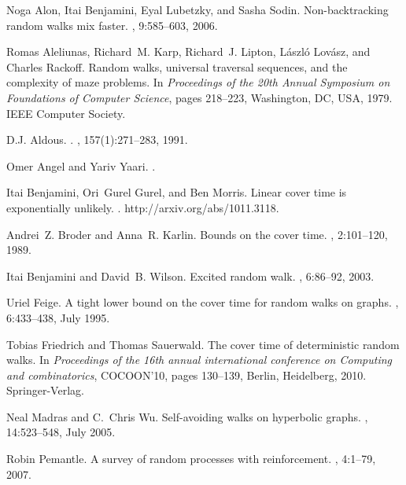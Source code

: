 \documentclass[12pt,a4paper]{article}
\newcommand{\0}{{\bf 0}}
\begin{document}
\newcommand{\etalchar}[1]{$^{#1}$}
\begin{thebibliography}{ABLS06}

Noga Alon, Itai Benjamini, Eyal Lubetzky, and Sasha Sodin.
\newblock Non-backtracking random walks mix faster.
, 9:585--603, 2006.

\bibitem[AKL{\etalchar{+}}79]{AKLLR79}
Romas Aleliunas, Richard~M. Karp, Richard~J. Lipton, L\'{a}szl\'{o} Lov\'{a}sz,
  and Charles Rackoff.
\newblock Random walks, universal traversal sequences, and the complexity of
  maze problems.
\newblock In {\em Proceedings of the 20th Annual Symposium on Foundations of
  Computer Science}, pages 218--223, Washington, DC, USA, 1979. IEEE Computer
  Society.

D.J. Aldous.
.
,
  157(1):271--283, 1991.

Omer Angel and Yariv Yaari.
.

Itai Benjamini, Ori~Gurel Gurel, and Ben Morris.
\newblock Linear cover time is exponentially unlikely.
.
\newblock http://arxiv.org/abs/1011.3118.

Andrei~Z. Broder and Anna~R. Karlin.
\newblock Bounds on the cover time.
, 2:101--120, 1989.

Itai Benjamini and David~B. Wilson.
\newblock Excited random walk.
, 6:86--92, 2003.

Uriel Feige.
\newblock A tight lower bound on the cover time for random walks on graphs.
, 6:433--438, July 1995.

Tobias Friedrich and Thomas Sauerwald.
\newblock The cover time of deterministic random walks.
\newblock In {\em Proceedings of the 16th annual international conference on
  Computing and combinatorics}, COCOON'10, pages 130--139, Berlin, Heidelberg,
  2010. Springer-Verlag.

Neal Madras and C.~Chris Wu.
\newblock Self-avoiding walks on hyperbolic graphs.
, 14:523--548, July 2005.

Robin Pemantle.
\newblock A survey of random processes with reinforcement.
, 4:1--79, 2007.

\end{thebibliography}
\end{document}

